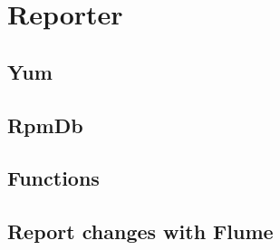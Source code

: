 \section{Reporter}

\subsection{Yum}
\subsection{RpmDb}
\subsection{Functions}
\subsection{Report changes with Flume}
